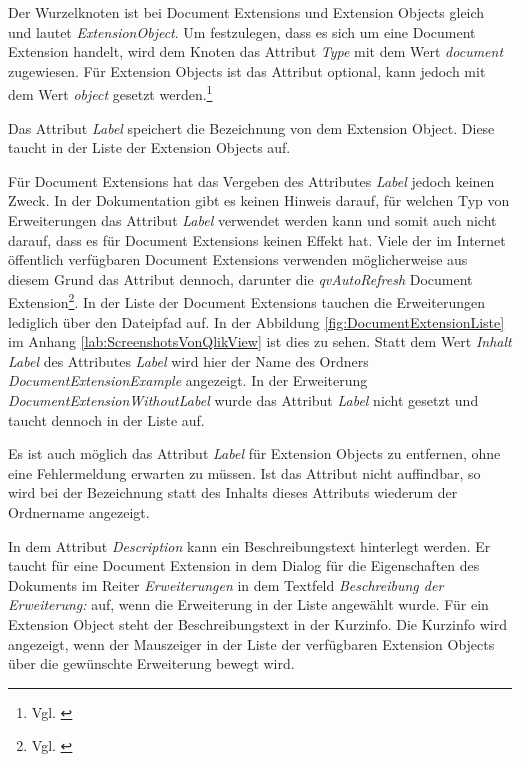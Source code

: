 Der Wurzelknoten ist bei Document Extensions und Extension Objects gleich und lautet \textit{ExtensionObject}. Um festzulegen, dass es sich um eine Document Extension handelt, wird dem Knoten das Attribut \textit{Type} mit dem Wert \textit{document} zugewiesen. Für Extension Objects ist das Attribut optional, kann jedoch mit dem Wert \textit{object} gesetzt werden.\footnote{Vgl. \cite{ExtensionDefinitionFileQlikCommunity}}

Das Attribut \textit{Label} speichert die Bezeichnung von dem Extension Object. Diese taucht in der Liste der Extension Objects auf.

Für Document Extensions hat das Vergeben des Attributes \textit{Label} jedoch keinen Zweck. In der Dokumentation gibt es keinen Hinweis darauf, für welchen Typ von Erweiterungen das Attribut \textit{Label} verwendet werden kann und somit auch nicht darauf, dass es für Document Extensions keinen Effekt hat. Viele der im Internet öffentlich verfügbaren Document Extensions verwenden möglicherweise aus diesem Grund das Attribut dennoch, darunter die \textit{qvAutoRefresh} Document Extension\footnote{Vgl. \cite{qvAutoRefreshDefinitionXml}}. In der Liste der Document Extensions tauchen die Erweiterungen lediglich über den Datei\-pfad auf. In der Abbildung \ref{fig:DocumentExtensionListe} im Anhang \ref{lab:ScreenshotsVonQlikView} ist dies zu sehen. Statt dem Wert \textit{Inhalt Label} des Attributes \textit{Label} wird hier der Name des Ordners \textit{DocumentExtensionExample} angezeigt. In der Erweiterung \textit{DocumentExtensionWithoutLabel} wurde das Attribut \textit{Label} nicht gesetzt und taucht dennoch in der Liste auf.

Es ist auch möglich das Attribut \textit{Label} für Extension Objects zu entfernen, ohne eine Fehler\-meldung erwarten zu müssen. Ist das Attribut nicht auffindbar, so wird bei der Bezeich\-nung statt des Inhalts dieses Attributs wiederum der Ordnername angezeigt.

In dem Attribut \textit{Description} kann ein Beschreibungs\-text hinterlegt werden. Er taucht für eine Document Extension in dem Dialog für die Eigenschaften des Dokuments im Reiter \textit{Erweiterungen} in dem Textfeld \textit{Beschreibung der Erweiterung:} auf, wenn die Erweiterung in der Liste angewählt wurde. Für ein Extension Object steht der Beschreibungs\-text in der Kurzinfo. Die Kurzinfo wird angezeigt, wenn der Mauszeiger in der Liste der verfügbaren Extension Objects über die gewünschte Erweiterung bewegt wird.


